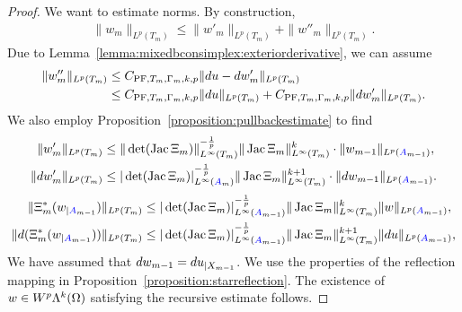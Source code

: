 \documentclass[10pt,a4paper]{article}
\begin{document}
\begin{proof}
    We want to estimate norms. 
    By construction,
    \begin{align*}
        \| w_{m} \|_{L^{p}(T_{m})}
        \leq  
        \| w'_{m} \|_{L^{p}(T_{m})}
        + 
        \| w''_{m} \|_{L^{p}(T_{m})}
        .
    \end{align*}
    Due to Lemma~\ref{lemma:mixedbconsimplex:exteriorderivative},
    we can assume 
    \begin{align*}
        \| w''_{m} \|_{L^{p}(T_{m})} 
        &
        \leq 
        C_{{\rm PF},T_{m},\Gamma_{m},k,p} \| d u - d w'_{m} \|_{L^{p}(T_{m})}
        \\&
        \leq 
        C_{{\rm PF},T_{m},\Gamma_{m},k,p} \| d u      \|_{L^{p}(T_{m})} 
        + 
        C_{{\rm PF},T_{m},\Gamma_{m},k,p} \| d w'_{m} \|_{L^{p}(T_{m})} 
        .
    \end{align*}
    We also employ Proposition~\ref{proposition:pullbackestimate} to find 
    \begin{align*}
        \| w'_{m} \|_{L^{p}(T_{m})}
        &\leq 
        \|\det(\operatorname{{\rm Jac}} \Xi_{m}  )\|_{L^{\infty}(T_{m})}^{-\frac 1 p} 
        \| \operatorname{{\rm Jac}} \Xi_{m} \|_{L^{\infty}(T_{m})}^{k}
        \cdot 
        \| w_{m-1} \|_{L^{p}({\color{blue}A}_{m-1})}
        ,
        \\
        \| d w'_{m} \|_{L^{p}(T_{m})}
        &\leq 
        |\det(\operatorname{{\rm Jac}} \Xi_{m}  )|^{-\frac 1 p}_{L^{\infty}({\color{blue}A}_{m})} 
        \| \operatorname{{\rm Jac}} \Xi_{m} \|_{L^{\infty}(T_{m})}^{k+1}
        \cdot 
        \| d w_{m-1} \|_{L^{p}({\color{blue}A}_{m-1})}
        .
    \end{align*}
    \begin{align*}
        \| \Xi_{m}^{\ast}(w_{|{\color{blue}A}_{m-1}}) \|_{L^{p}(T_{m})}
        &\leq 
        |\det(\operatorname{{\rm Jac}} \Xi_{m}  )|^{-\frac 1 p}_{L^{\infty}({\color{blue}A}_{m-1})} 
        \| \operatorname{{\rm Jac}} \Xi_{m} \|^{k}_{L^{\infty}(T_{m})}
        \| w \|_{L^{p}({\color{blue}A}_{m-1})}
        ,
        \\
        \| d (\Xi_{m}^{\ast}(w_{|{\color{blue}A}_{m-1}})) \|_{L^{p}(T_{m})}
        &\leq 
        |\det(\operatorname{{\rm Jac}} \Xi_{m}  )|^{-\frac 1 p}_{L^{\infty}({\color{blue}A}_{m-1})} 
        \| \operatorname{{\rm Jac}} \Xi_{m} \|^{k+1}_{L^{\infty}(T_{m})}
        \| d u \|_{L^{p}({\color{blue}A}_{m-1})}
        ,
    \end{align*}
    We have assumed that $d w_{m-1} = d u_{|X_{m-1}}$. 
    We use the properties of the reflection mapping in Proposition~\ref{proposition:starreflection}. 
    The existence of $w \in W^{p}\Lambda^{k}(\Omega)$ satisfying the recursive estimate follows. 
\end{proof}
\end{document}
